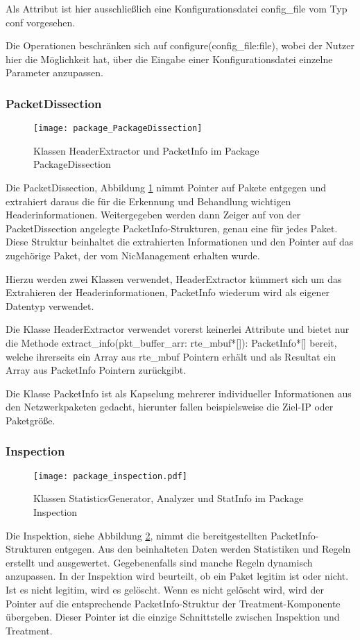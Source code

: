 \documentclass[../review_1.tex]{subfiles}
\begin{document}
Als Attribut ist hier ausschließlich eine Konfigurationsdatei config\_file vom Typ conf vorgesehen.

Die Operationen beschränken sich auf configure(config\_file:file), wobei der Nutzer hier die Möglichkeit hat, über die Eingabe einer Konfigurationsdatei einzelne Parameter anzupassen.

\subsubsection{PacketDissection}
\begin{figure} [t]
	\centering
	\texttt{[image: package\_PackageDissection]}
	\caption{Klassen HeaderExtractor und PacketInfo im Package PackageDissection}
	\label{fig:HeaderExtractor}
\end{figure}
Die PacketDissection, Abbildung \ref{fig:HeaderExtractor} nimmt Pointer auf Pakete entgegen und extrahiert daraus die für die Erkennung und Behandlung wichtigen Headerinformationen. Weitergegeben werden dann Zeiger auf von der PacketDissection angelegte PacketInfo-Strukturen, genau eine für jedes Paket. Diese Struktur beinhaltet die extrahierten Informationen und den Pointer auf das zugehörige Paket, der vom NicManagement erhalten wurde.

Hierzu werden zwei Klassen verwendet, HeaderExtractor kümmert sich um das Extrahieren der Headerinformationen, PacketInfo wiederum wird als eigener Datentyp verwendet.

Die Klasse HeaderExtractor verwendet vorerst keinerlei Attribute und bietet nur die Methode
extract\_info(pkt\_buffer\_arr: rte\_mbuf*[]): PacketInfo*[] bereit, welche ihrerseits ein Array aus rte\_mbuf Pointern erhält und als Resultat ein Array aus PacketInfo Pointern zurückgibt.

Die Klasse PacketInfo ist als Kapselung mehrerer individueller Informationen aus den Netzwerkpaketen gedacht, hierunter fallen beispielsweise die Ziel-IP oder Paketgröße.


\subsubsection{Inspection}
\begin{figure} [t]
	\centering
	\texttt{[image: package\_inspection.pdf]}
	\caption{Klassen StatisticsGenerator, Analyzer und StatInfo im Package Inspection}
		\label{fig:Inspection}
\end{figure}
Die Inspektion, siehe Abbildung \ref{fig:Inspection}, nimmt die bereitgestellten PacketInfo-Strukturen entgegen. Aus den beinhalteten Daten werden Statistiken und Regeln erstellt und ausgewertet. Gegebenenfalls sind manche Regeln dynamisch anzupassen.  In der Inspektion wird beurteilt, ob ein Paket legitim ist oder nicht. Ist es nicht legitim, wird es gelöscht. Wenn es nicht gelöscht wird, wird der Pointer auf die entsprechende PacketInfo-Struktur der Treatment-Komponente übergeben. Dieser Pointer ist die einzige Schnittstelle zwischen Inspektion und Treatment.
\end{document}
